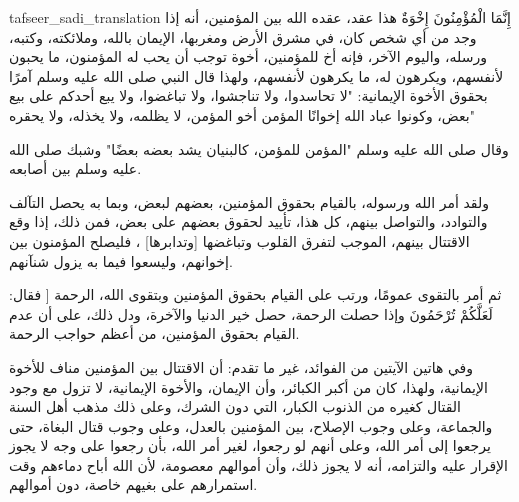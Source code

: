 \begin{taggedblock}{tafseer_sadi_translation}
{ إِنَّمَا الْمُؤْمِنُونَ إِخْوَةٌ }
هذا عقد، عقده الله بين المؤمنين، أنه إذا وجد من أي شخص كان، في مشرق الأرض ومغربها، الإيمان بالله، وملائكته، وكتبه، ورسله، واليوم الآخر، فإنه أخ للمؤمنين، أخوة توجب أن يحب له المؤمنون، ما يحبون لأنفسهم، ويكرهون له، ما يكرهون لأنفسهم، ولهذا قال النبي صلى الله عليه وسلم آمرًا بحقوق الأخوة الإيمانية:
"لا تحاسدوا، ولا تناجشوا، ولا تباغضوا، ولا يبع أحدكم على بيع بعض، وكونوا عباد الله إخوانًا المؤمن أخو المؤمن، لا يظلمه، ولا يخذله، ولا يحقره"

وقال صلى الله عليه وسلم
"المؤمن للمؤمن، كالبنيان يشد بعضه بعضًا"
وشبك صلى الله عليه وسلم بين أصابعه.

ولقد أمر الله ورسوله، بالقيام بحقوق المؤمنين، بعضهم لبعض، وبما به يحصل التآلف والتوادد، والتواصل بينهم، كل هذا، تأييد لحقوق بعضهم على بعض، فمن ذلك، إذا وقع الاقتتال بينهم، الموجب لتفرق القلوب وتباغضها
[وتدابرها]
، فليصلح المؤمنون بين إخوانهم، وليسعوا فيما به يزول شنآنهم.

ثم أمر بالتقوى عمومًا، ورتب على القيام بحقوق المؤمنين وبتقوى الله، الرحمة [ فقال:
{ لَعَلَّكُمْ تُرْحَمُونَ }
وإذا حصلت الرحمة، حصل خير الدنيا والآخرة، ودل ذلك، على أن عدم القيام بحقوق المؤمنين، من أعظم حواجب الرحمة.

وفي هاتين الآيتين من الفوائد، غير ما تقدم: أن الاقتتال بين المؤمنين مناف للأخوة الإيمانية، ولهذا، كان من أكبر الكبائر، وأن الإيمان، والأخوة الإيمانية، لا تزول مع وجود القتال كغيره من الذنوب الكبار، التي دون الشرك، وعلى ذلك مذهب أهل السنة والجماعة، وعلى وجوب الإصلاح، بين المؤمنين بالعدل، وعلى وجوب قتال البغاة، حتى يرجعوا إلى أمر الله، وعلى أنهم لو رجعوا، لغير أمر الله، بأن رجعوا على وجه لا يجوز الإقرار عليه والتزامه، أنه لا يجوز ذلك، وأن أموالهم معصومة، لأن الله أباح دماءهم وقت استمرارهم على بغيهم خاصة، دون أموالهم.
\end{taggedblock}

\begin{comment}
Please use the following for footnotes:- Sample\footnoteQ{Text of Qur'an footnote goes here.}.
Sample\footnoteT{Text of Tafseer footnote goes here.}.
\end{comment}